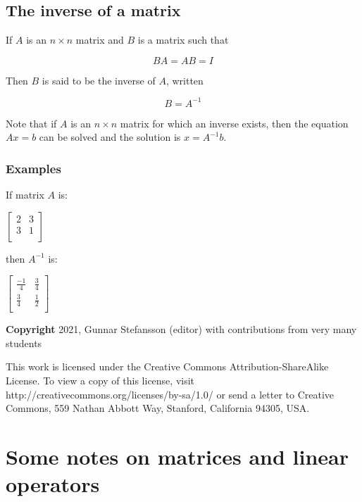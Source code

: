 \documentclass[12pt,a4paper]{article}
\theoremstyle{regla}
\theoremstyle{remark}
\theoremstyle{definition}
\theoremstyle{nonumberbreak}
\begin{document}
\subsection{The inverse of a matrix}
\begin{fbox}
\begin{minipage}{0.97\textwidth}
If $A$ is an $n \times n$ matrix and $B$ is a matrix such that

$$ BA = AB = I$$

Then $B$ is said to be the inverse of $A$, written 

$$ B = A ^{-1} $$

Note that if $A$ is an $n \times n$ matrix for which an inverse exists, then the equation $Ax = b$ can be solved and the solution is $x = A^{-1} b$.

\end{minipage}
\end{fbox}
\subsubsection{Examples}
\begin{xmpl}

If matrix $A$ is:

$\begin{bmatrix}
2 & 3  \\
3 & 1  \\
\end{bmatrix}$

then $A ^{-1}$ is:

$\begin{bmatrix}
\frac{-1}{4} & \frac{3}{4}  \\
\frac{3}{4} & \frac{1}{2}  \\
\end{bmatrix}$
\end{xmpl}

{\bf Copyright}
2021, Gunnar Stefansson (editor) with contributions from very many students

This work is licensed under the Creative Commons
Attribution-ShareAlike License. To view a copy of this license, visit
http://creativecommons.org/licenses/by-sa/1.0/ or send a letter to
Creative Commons, 559 Nathan Abbott Way, Stanford, California 94305,
USA.
\clearpage
\section{Some notes on matrices and linear operators}
\end{document}
